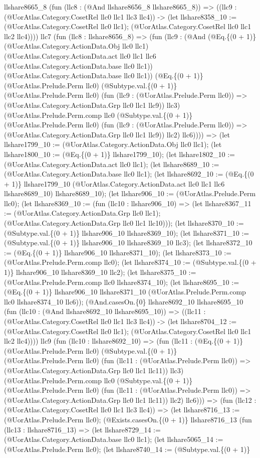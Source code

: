 \documentclass[11pt]{article}
\begin{document}
llshare8665\_8 (fun (llc8 : (@And llshare8656\_8 llshare8665\_8)) => ((llc9 : (@UorAtlas.Category.CosetRel llc0 llc1 llc3 llc4)) -> (let llshare8358\_10 := (@UorAtlas.Category.CosetRel llc0 llc1); (@UorAtlas.Category.CosetRel llc0 llc1 llc2 llc4)))) llc7 (fun (llc8 : llshare8656\_8) => (fun (llc9 : (@And (@Eq.\{(0 + 1)\} (@UorAtlas.Category.ActionData.Obj llc0 llc1) (@UorAtlas.Category.ActionData.act llc0 llc1 llc6 (@UorAtlas.Category.ActionData.base llc0 llc1)) (@UorAtlas.Category.ActionData.base llc0 llc1)) (@Eq.\{(0 + 1)\} (@UorAtlas.Prelude.Perm llc0) (@Subtype.val.\{(0 + 1)\} (@UorAtlas.Prelude.Perm llc0) (fun (llc9 : (@UorAtlas.Prelude.Perm llc0)) => (@UorAtlas.Category.ActionData.Grp llc0 llc1 llc9)) llc3) (@UorAtlas.Prelude.Perm.comp llc0 (@Subtype.val.\{(0 + 1)\} (@UorAtlas.Prelude.Perm llc0) (fun (llc9 : (@UorAtlas.Prelude.Perm llc0)) => (@UorAtlas.Category.ActionData.Grp llc0 llc1 llc9)) llc2) llc6)))) => (let llshare1799\_10 := (@UorAtlas.Category.ActionData.Obj llc0 llc1); (let llshare1800\_10 := (@Eq.\{(0 + 1)\} llshare1799\_10); (let llshare1802\_10 := (@UorAtlas.Category.ActionData.act llc0 llc1); (let llshare8689\_10 := (@UorAtlas.Category.ActionData.base llc0 llc1); (let llshare8692\_10 := (@Eq.\{(0 + 1)\} llshare1799\_10 (@UorAtlas.Category.ActionData.act llc0 llc1 llc6 llshare8689\_10) llshare8689\_10); (let llshare906\_10 := (@UorAtlas.Prelude.Perm llc0); (let llshare8369\_10 := (fun (llc10 : llshare906\_10) => (let llshare8367\_11 := (@UorAtlas.Category.ActionData.Grp llc0 llc1); (@UorAtlas.Category.ActionData.Grp llc0 llc1 llc10))); (let llshare8370\_10 := (@Subtype.val.\{(0 + 1)\} llshare906\_10 llshare8369\_10); (let llshare8371\_10 := (@Subtype.val.\{(0 + 1)\} llshare906\_10 llshare8369\_10 llc3); (let llshare8372\_10 := (@Eq.\{(0 + 1)\} llshare906\_10 llshare8371\_10); (let llshare8373\_10 := (@UorAtlas.Prelude.Perm.comp llc0); (let llshare8374\_10 := (@Subtype.val.\{(0 + 1)\} llshare906\_10 llshare8369\_10 llc2); (let llshare8375\_10 := (@UorAtlas.Prelude.Perm.comp llc0 llshare8374\_10); (let llshare8695\_10 := (@Eq.\{(0 + 1)\} llshare906\_10 llshare8371\_10 (@UorAtlas.Prelude.Perm.comp llc0 llshare8374\_10 llc6)); (@And.casesOn.\{0\} llshare8692\_10 llshare8695\_10 (fun (llc10 : (@And llshare8692\_10 llshare8695\_10)) => ((llc11 : (@UorAtlas.Category.CosetRel llc0 llc1 llc3 llc4)) -> (let llshare8704\_12 := (@UorAtlas.Category.CosetRel llc0 llc1); (@UorAtlas.Category.CosetRel llc0 llc1 llc2 llc4)))) llc9 (fun (llc10 : llshare8692\_10) => (fun (llc11 : (@Eq.\{(0 + 1)\} (@UorAtlas.Prelude.Perm llc0) (@Subtype.val.\{(0 + 1)\} (@UorAtlas.Prelude.Perm llc0) (fun (llc11 : (@UorAtlas.Prelude.Perm llc0)) => (@UorAtlas.Category.ActionData.Grp llc0 llc1 llc11)) llc3) (@UorAtlas.Prelude.Perm.comp llc0 (@Subtype.val.\{(0 + 1)\} (@UorAtlas.Prelude.Perm llc0) (fun (llc11 : (@UorAtlas.Prelude.Perm llc0)) => (@UorAtlas.Category.ActionData.Grp llc0 llc1 llc11)) llc2) llc6))) => (fun (llc12 : (@UorAtlas.Category.CosetRel llc0 llc1 llc3 llc4)) => (let llshare8716\_13 := (@UorAtlas.Prelude.Perm llc0); (@Exists.casesOn.\{(0 + 1)\} llshare8716\_13 (fun (llc13 : llshare8716\_13) => (let llshare8729\_14 := (@UorAtlas.Category.ActionData.base llc0 llc1); (let llshare5065\_14 := (@UorAtlas.Prelude.Perm llc0); (let llshare8740\_14 := (@Subtype.val.\{(0 + 1)\} 
\end{document}
